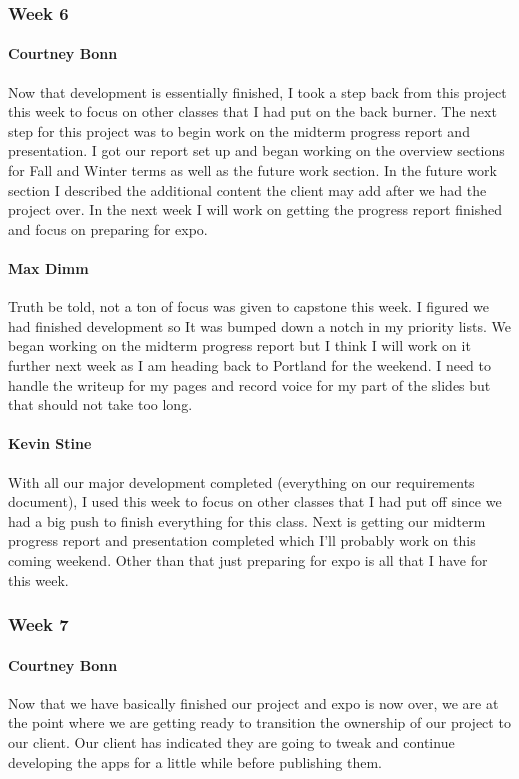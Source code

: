 		\subsubsection{Week 6}
		
			\paragraph{Courtney Bonn}
			Now that development is essentially finished, I took a step back from this project this week to focus on other classes that I had put on the back burner. The next step for this project was to begin work on the midterm progress report and presentation. I got our report set up and began working on the overview sections for Fall and Winter terms as well as the future work section. In the future work section I described the additional content the client may add after we had the project over. In the next week I will work on getting the progress report finished and focus on preparing for expo.

			\paragraph{Max Dimm}
			Truth be told, not a ton of focus was given to capstone this week. I figured we had finished development so It was bumped down a notch in my priority lists. We began working on the midterm progress report but I think I will work on it further next week as I am heading back to Portland for the weekend. I need to handle the writeup for my pages and record voice for my part of the slides but that should not take too long.
			
			\paragraph{Kevin Stine}
			With all our major development completed (everything on our requirements document), I used this week to focus on other classes that I had put off since we had a big push to finish everything for this class. Next is getting our midterm progress report and presentation completed which I'll probably work on this coming weekend. Other than that just preparing for expo is all that I have for this week.
			
		\subsubsection{Week 7}
		
			\paragraph{Courtney Bonn}
			Now that we have basically finished our project and expo is now over, we are at the point where we are getting ready to transition the ownership of our project to our client. Our client has indicated they are going to tweak and continue developing the apps for a little while before publishing them.

